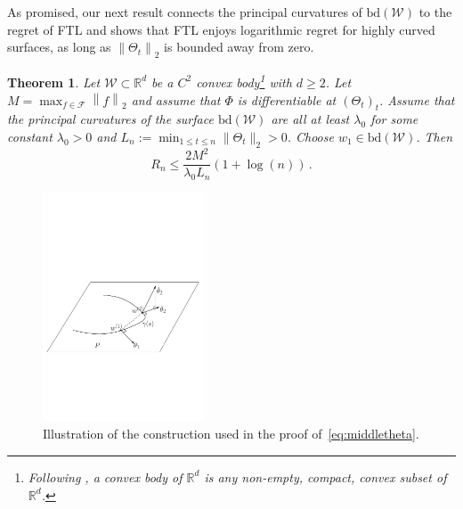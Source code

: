\documentclass[english]{article}
\newcommand{\cW}{\mathcal{W}}
\newcommand{\cF}{\mathcal{F}}
\newcommand{\R}{\mathbb{R}}
\newcommand{\norm}[1]{\left\| #1 \right\|}
\newcommand{\bd}{\mathrm{bd}}
\newtheorem{thm}{Theorem}[section]
\begin{document}
As promised, our next result connects the principal curvatures of $\bd(\cW)$ to the regret of FTL
and shows that FTL enjoys logarithmic regret for highly curved surfaces, as long as $\norm{\Theta_t}_2$ 
is bounded away from zero.
\begin{thm}
\label{thm:R_curvesurface}
Let $\cW\subset \R^d$ be a $C^2$ convex body\footnote{Following \citet{Sch14:ConvexBodies}, a convex body of $\R^d$ is any
 non-empty, compact, convex subset of $\R^d$.}  with $d\ge 2$.
Let $M = \max_{f\in \cF} \norm{f}_2$ and assume that $\Phi$ is differentiable at $(\Theta_t)_{t}$.
Assume that the principal curvatures of the surface $\bd(\cW)$ 
are all at least $\lambda_0$ for some constant $\lambda_0>0$ and $L_n:=\min_{1\le t \le n} \|\Theta_t\|_2 >0$. 
Choose $w_1\in \bd(\cW)$.
Then
\[
R_n \le \frac{2M^2}{\lambda_0 L_n}(1+ \log(n))\,.
\]
\end{thm}
\begin{figure}
	\vspace{-.5cm}
\begin{framed}
	\centering
	\includegraphics[width=4.8cm, trim={4.8cm 1cm 3cm 0},clip]{figures/GaussmapPro}
	\caption{Illustration of the construction used in the proof of~\eqref{eq:middletheta}.} 
  	\label{fig:cuttingplane}
\end{framed}
\vspace{-.8cm}
\end{figure} 
\end{document}

